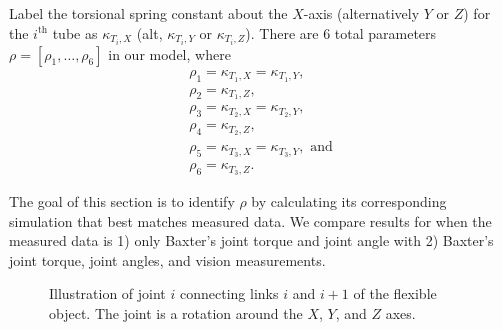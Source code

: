 \documentclass[runningheads,a4paper]{llncs}
\begin{document}
Label the torsional spring constant about the $X$-axis (alternatively $Y$ or $Z$) for the $i^{\textrm{th}}$ tube as $\kappa_{T_i,X}$ (alt, $\kappa_{T_i,Y}$ or $\kappa_{T_i,Z}$). There are 6 total parameters $\rho = [\rho_1,\ldots,\rho_6]$ in our model, where 
\begin{equation}
\begin{array}{l}
\rho_1 = \kappa_{T_1,X} = \kappa_{T_1,Y}, \\
\rho_2 = \kappa_{T_1,Z}, \\
\rho_3 = \kappa_{T_2,X} = \kappa_{T_2,Y}, \\
\rho_4 = \kappa_{T_2,Z} , \\
\rho_5 = \kappa_{T_3,X} = \kappa_{T_3,Y}, \textrm{ and} \\
\rho_6 = \kappa_{T_3,Z}. 
\end{array}
\label{eq-params}
\end{equation}

The goal of this section is to identify $\rho$ by calculating its corresponding simulation that best matches measured data.  We compare results for when the measured data is 1) only Baxter's joint torque and joint angle with 2) Baxter's joint torque, joint angles, and vision measurements.

\begin{figure}[!htb]
\centering
\def\svgwidth{.80\textwidth}%

\caption{Illustration of joint $i$ connecting links $i$ and $i+1$ of the flexible object.  The joint is a rotation around the $X$, $Y$, and $Z$ axes.}
\label{fig-tube_link}
\end{figure}
\end{document}
